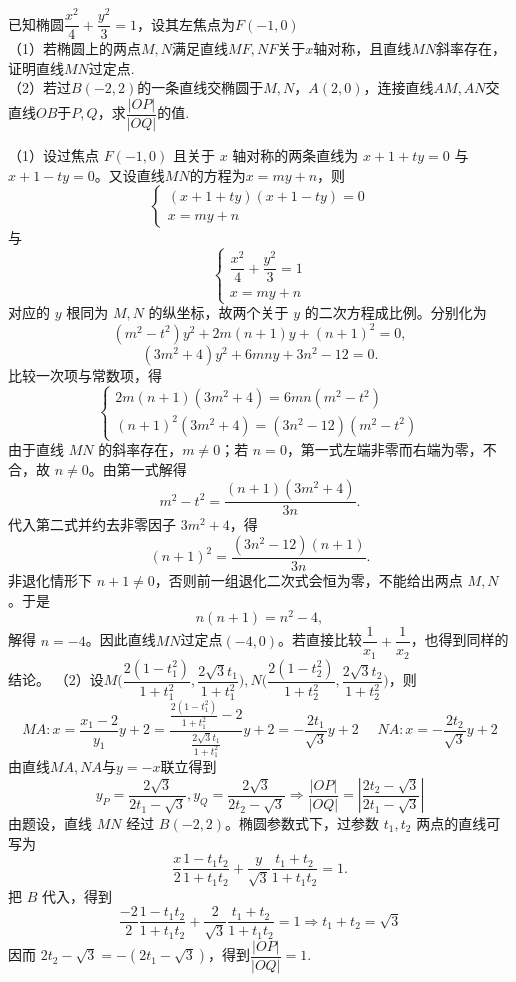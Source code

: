 \begin{example}[（杭二模拟）]
    \noindent 已知椭圆$\dfrac{x^2}{4}+\dfrac{y^2}{3}=1$，设其左焦点为$F(-1,0)$\vspace{10pt}\\
    （1）若椭圆上的两点$M,N$满足直线$MF,NF$关于$x$轴对称，且直线$MN$斜率存在，证明直线$MN$过定点.\\
    （2）若过$B(-2,2)$的一条直线交椭圆于$M,N$，$A(2,0)$，连接直线$AM,AN$交直线$OB$于$P,Q$，求$\dfrac{|OP|}{|OQ|}$的值.
\end{example}
\begin{solution}
    （1）设过焦点 $F(-1,0)$ 且关于 $x$ 轴对称的两条直线为 $x+1+ty=0$ 与 $x+1-ty=0$。又设直线$MN$的方程为$x=my+n$，则
    \[\begin{cases}(x+1+ty)(x+1-ty)=0\\x=my+n\end{cases}\]
与
\[
\begin{cases}\dfrac{x^2}{4}+\dfrac{y^2}{3}=1\\x=my+n\end{cases}
\]
对应的 $y$ 根同为 $M,N$ 的纵坐标，故两个关于 $y$ 的二次方程成比例。分别化为
\[
(m^2-t^2)y^2+2m(n+1)y+(n+1)^2=0,
\]
\[
(3m^2+4)y^2+6mny+3n^2-12=0.
\]
比较一次项与常数项，得
    \[\begin{cases} 2m(n+1)(3m^2 + 4) = 6mn(m^2 - t^2)\\(n+1)^2(3m^2 + 4) = (3n^2-12)(m^2 - t^2)\end{cases}\]
由于直线 $MN$ 的斜率存在，$m\ne0$；若 $n=0$，第一式左端非零而右端为零，不合，故 $n\ne0$。由第一式解得
\[
m^2-t^2=\frac{(n+1)(3m^2+4)}{3n}.
\]
代入第二式并约去非零因子 $3m^2+4$，得
\[
(n+1)^2=\frac{(3n^2-12)(n+1)}{3n}.
\]
非退化情形下 $n+1\ne0$，否则前一组退化二次式会恒为零，不能给出两点 $M,N$。于是
\[
n(n+1)=n^2-4,
\]
解得 $n=-4$。因此直线$MN$过定点$(-4,0)$。若直接比较$\dfrac{1}{x_1}+\dfrac{1}{x_2}$，也得到同样的结论。
    （2）设$M\bigg(\dfrac{2(1-t_1^2)}{1+t_1^2},\dfrac{2\sqrt{3}t_1}{1+t_1^2}\bigg),N\bigg(\dfrac{2(1-t_2^2)}{1+t_2^2},\dfrac{2\sqrt{3}t_2}{1+t_2^2}\bigg)$，则\[MA:x=\dfrac{x_1-2}{y_1}y+2=\dfrac{\frac{2(1-t_1^2)}{1+t_1^2}-2}{\frac{2\sqrt{3}t_1}{1+t_1^2}}y+2=-\dfrac{2t_1}{\sqrt3}y+2~~~~~~NA:x=-\dfrac{2t_2}{\sqrt3}y+2\]由直线$MA,NA$与$y=-x$联立得到
    \[y_P=\dfrac{2\sqrt3}{2t_1-\sqrt3},y_Q=\dfrac{2\sqrt3}{2t_2-\sqrt3}\Rightarrow \dfrac{|OP|}{|OQ|}=\left|\dfrac{2t_2-\sqrt3}{2t_1-\sqrt3}\right|\]
    由题设，直线 $MN$ 经过 $B(-2,2)$。椭圆参数式下，过参数 $t_1,t_2$ 两点的直线可写为
    \[
    \frac{x}{2}\frac{1-t_1t_2}{1+t_1t_2}+\frac{y}{\sqrt3}\frac{t_1+t_2}{1+t_1t_2}=1.
    \]
    把 $B$ 代入，得到
    \[\dfrac{-2}{2}\dfrac{1-t_1t_2}{1+t_1t_2}+\dfrac{2}{\sqrt3}\dfrac{t_1+t_2}{1+t_1t_2}=1\Rightarrow t_1+t_2=\sqrt3\]
    因而 $2t_2-\sqrt3=-(2t_1-\sqrt3)$，得到$\dfrac{|OP|}{|OQ|}=1$.
\end{solution}

